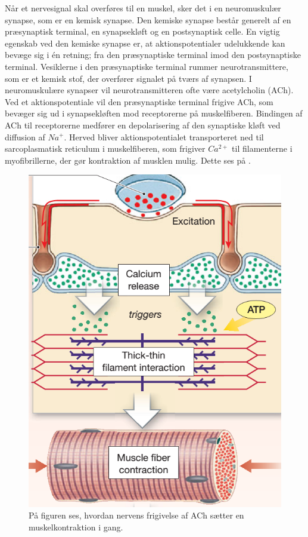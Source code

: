 Når et nervesignal skal overføres til en muskel, sker det i en neuromuskulær synapse, som er en kemisk synapse. Den kemiske synapse består generelt af en præsynaptisk terminal, en synapsekløft og en postsynaptisk celle. En vigtig egenskab ved den kemiske synapse er, at aktionspotentialer udelukkende kan bevæge sig i én retning; fra den præsynaptiske terminal imod den postsynaptiske terminal.\cite{Hall2015} Vesiklerne i den præsynaptiske terminal rummer neurotransmittere, som er et kemisk stof, der overfører signalet på tværs af synapsen. I neuromuskulære synapser vil neurotransmitteren ofte være acetylcholin (ACh). Ved et aktionspotentiale vil den præsynaptiske terminal frigive ACh, som bevæger sig ud i synapsekløften mod receptorerne på muskelfiberen. Bindingen af ACh til receptorerne medfører en depolarisering af den synaptiske kløft ved diffusion af $Na^{+}$. Herved bliver aktionspotentialet transporteret ned til sarcoplasmatisk reticulum i muskelfiberen, som frigiver $Ca^{2+}$ til filamenterne i myofibrillerne, der gør kontraktion af musklen mulig.\cite{Hall2015,Martini2012} Dette ses på .

\begin{figure}[H]
	\centering
	\includegraphics[scale=0.7]{figures/bProblemanalyse/Aktion1.png}
	\caption{På figuren ses, hvordan nervens frigivelse af ACh sætter en muskelkontraktion i gang. \cite{Martini2012}}
	\label{nervemuskel}
\end{figure}